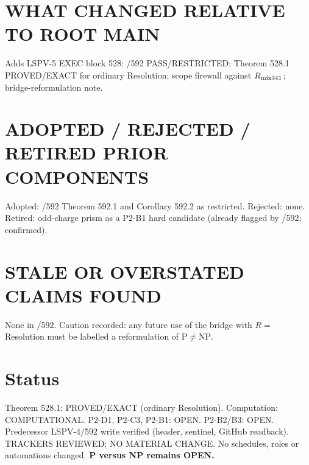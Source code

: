 \documentclass[11pt]{article}
\begin{document}
\section*{WHAT CHANGED RELATIVE TO ROOT MAIN}
Adds LSPV-5 EXEC block 528: /592 PASS/RESTRICTED; Theorem 528.1 PROVED/EXACT for ordinary Resolution; scope
firewall against $R_{\rm mix341}$; bridge-reformulation note.

\section*{ADOPTED / REJECTED / RETIRED PRIOR COMPONENTS}
Adopted: /592 Theorem 592.1 and Corollary 592.2 as restricted. Rejected: none. Retired: odd-charge prism as a
P2-B1 hard candidate (already flagged by /592; confirmed).

\section*{STALE OR OVERSTATED CLAIMS FOUND}
None in /592. Caution recorded: any future use of the bridge with $R=$ Resolution must be labelled a reformulation
of $\mathrm P\ne\mathrm{NP}$.

\section*{Status}
Theorem 528.1: PROVED/EXACT (ordinary Resolution). Computation: COMPUTATIONAL. P2-D1, P2-C3, P2-B1: OPEN. P2-B2/B3:
OPEN. Predecessor LSPV-4/592 write verified (header, sentinel, GitHub readback). TRACKERS REVIEWED; NO MATERIAL CHANGE.
No schedules, roles or automations changed. \textbf{P versus NP remains OPEN.}
\end{document}

